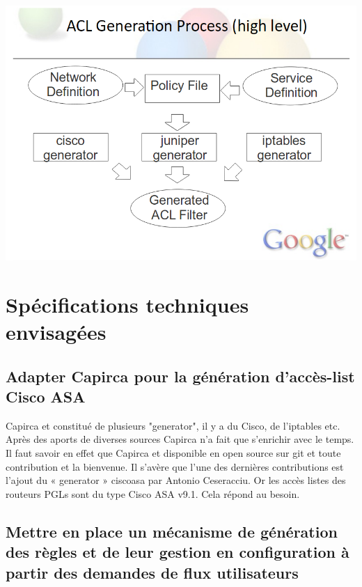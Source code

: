 \documentclass{article}
\begin{document}
\includegraphics[scale=0.4]{capirca.png}

\maketitle
\section{Spécifications techniques envisagées}

\maketitle
\subsection{Adapter Capirca pour la génération d’accès-list Cisco ASA}

Capirca et constitué de plusieurs "generator", il y a du Cisco, de l’iptables etc. Après des aports de diverses sources Capirca n’a fait que s’enrichir avec le temps. Il faut savoir en effet que Capirca et disponible en open source sur git et toute contribution et la bienvenue. Il s’avère que l’une des dernières contributions est l’ajout du « generator » ciscoasa par Antonio Ceseracciu. Or les accès listes des routeurs PGLs sont du type Cisco ASA v9.1. Cela répond au besoin.

\maketitle
\subsection{Mettre en place un mécanisme de génération des règles et de leur gestion en configuration à partir des demandes de flux utilisateurs}
\end{document}
